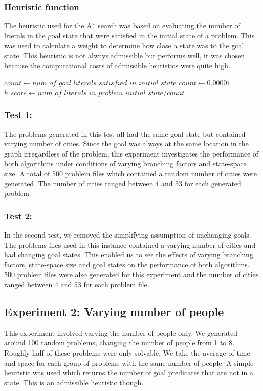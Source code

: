 \documentclass[letterpaper]{article}
\begin{document}
\subsubsection{Heuristic function}
The heuristic used for the A* search was based on evaluating the number of literals in the goal state
that were satisfied in the initial state of a problem. This was used to calculate a weight to determine
how close a state was to the goal state. This heuristic is not always admissible but performs well, it
was chosen because the computational costs of admissible heuristics were quite high.
\begin{algorithmic}
	\STATE $count \gets num\_of\_goal\_literals\_satisfied\_in\_initial\_state$ 
		\STATE $count \gets 0.00001$
	\ENDIF
	\STATE $h\_score \gets num\_of\_literals\_in\_problem\_initial\_state / count$

\end{algorithmic}
\subsubsection{Test 1:}
The problems generated in this test all had the same  goal state but contained varying number of
cities.
Since the goal was always at the same location in the graph irregardless of the problem, this experiment
investigates the performance of both algorithms under conditions of varying branching factors and
state-space size. A total of 500 problem files which contained a random number of cities were
generated. The number of cities ranged between 4 and 53 for each generated problem.

\subsubsection{Test 2:}
In the second test, we removed the simplifying assumption of unchanging goals. The problems
files used in this instance contained a varying number of cities and had changing goal states. This
enabled us to see the effects of varying branching factors, state-space size and goal states on the
performance of both algorithms. 500 problem files were also generated for this experiment and the
number of cities ranged between 4 and 53 for each problem file.

\subsection{Experiment 2: Varying number of people}
This experiment involved varying the number of people only. We generated around 100 random problems, changing the number of people
from 1 to 8. Roughly half of these problems were only solvable. We take the average of time and space for each group of problems with the same number of people.
A simple heuristic was used which returns the number of goal predicates that are not in a state. This is an admissible heuristic though.
\end{document}
